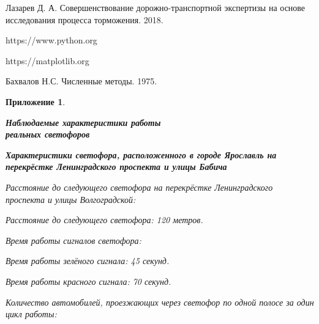 \documentclass[12pt, a4paper]{extarticle}
\numberwithin{equation}{section}
\newtheorem{attachment}{\hspace{12cm}  Приложение}
\numberwithin{figure}{section}
\begin{document}
\begin{thebibliography}{**}
	Лазарев Д. А. Совершенствование дорожно-транспортной экспертизы на основе исследования процесса торможения. 2018.

	https://www.python.org
	
	https://matplotlib.org
	
	Бахвалов Н.С.  Численные методы. 1975. 

\end{thebibliography}

\newpage

\begin{attachment} \label{att}
	\begin{center}
		\vspace{1cm}
		\rm{\Large{\textbf{ Наблюдаемые характеристики работы \\ реальных светофоров }}}
		\vspace{\baselineskip}
	\end{center}

\textup{\textbf{Характеристики светофора, расположенного в городе Ярославль на перекрёстке Ленинградского проспекта и улицы Бабича }}
\newline

\noindent\textup{Расстояние до следующего светофора на перекрёстке Ленинградского проспекта и улицы Волгоградской:}

Расстояние до следующего светофора: 120 метров.

\noindent\textup{Время работы сигналов светофора:}

Время работы зелёного сигнала: 45 секунд.
			
Время работы красного сигнала: 70 секунд.

\noindent\textup{Количество автомобилей, проезжающих через светофор по одной полосе за один цикл работы:}
	
\begin{table}[h!]
	\begin{minipage}{0.23\linewidth}
		

\end{minipage}
\end{table}
\end{attachment}
\end{document}
